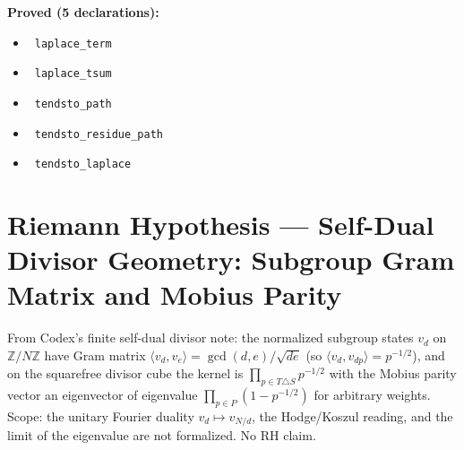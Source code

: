 \documentclass{report}
\theoremstyle{definition}
\begin{document}
\noindent\textbf{Proved (5 declarations):}
\begin{itemize}
  \item {}\leanok\ \texttt{laplace\_term}
  \item {}\leanok\ \texttt{laplace\_tsum}
  \item {}\leanok\ \texttt{tendsto\_path}
  \item {}\leanok\ \texttt{tendsto\_residue\_path}
  \item {}\leanok\ \texttt{tendsto\_laplace}
\end{itemize}

\section{Riemann Hypothesis --- Self-Dual Divisor Geometry: Subgroup Gram Matrix and Mobius Parity}
From Codex's finite self-dual divisor note: the normalized subgroup states $v_d$ on $\mathbb{Z}/N\mathbb{Z}$ have Gram matrix $\langle v_d,v_e\rangle=\gcd(d,e)/\sqrt{de}$ (so $\langle v_d,v_{dp}\rangle=p^{-1/2}$), and on the squarefree divisor cube the kernel is $\prod_{p\in T\triangle S}p^{-1/2}$ with the Mobius parity vector an eigenvector of eigenvalue $\prod_{p\in P}(1-p^{-1/2})$ for arbitrary weights. Scope: the unitary Fourier duality $v_d\mapsto v_{N/d}$, the Hodge/Koszul reading, and the limit of the eigenvalue are not formalized. No RH claim.
\end{document}
